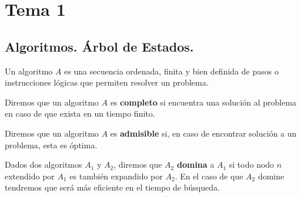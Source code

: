 \chapter{Tema 1}

\section{Algoritmos. Árbol de Estados.}

\begin{definicion}
    Un algoritmo $A$ es una secuencia ordenada, finita y bien definida de pasos o instrucciones lógicas que permiten resolver un problema. 
\end{definicion}

\begin{definicion}
    Diremos que un algoritmo $A$ es \textbf{completo} si encuentra una solución al problema en caso de que exista en un tiempo finito.
\end{definicion}

\begin{definicion}
    Diremos que un algoritmo $A$ es \textbf{admisible} si, en caso de encontrar solución a un problema, esta es óptima.
\end{definicion}

\begin{definicion}
    Dados dos algoritmos $A_1$ y $A_2$, diremos que $A_2$ \textbf{domina} a $A_1$ si todo nodo $n$ extendido por $A_1$ es también expandido por $A_2$. En el caso de que $A_2$ domine tendremos que será más eficiente en el tiempo de búsqueda.
\end{definicion}

